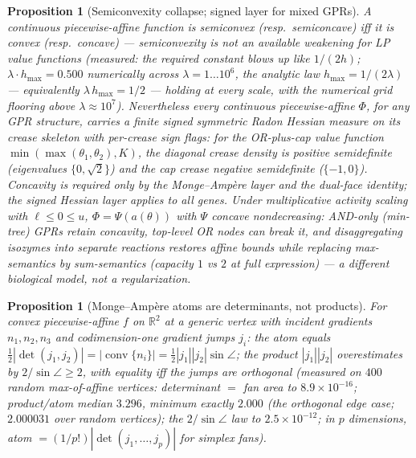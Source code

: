 \documentclass[11pt,a4paper]{article}
\theoremstyle{plain}
\newtheorem{proposition}[theorem]{Proposition}
\theoremstyle{definition}
\theoremstyle{remark}
\newcommand{\RR}{\mathbb{R}}
\begin{document}
\begin{proposition}[Semiconvexity collapse; signed layer for mixed
GPRs]\label{prop:semiconvex}
A continuous piecewise-affine function is semiconvex (resp.\
semiconcave) iff it is convex (resp.\ concave) --- semiconvexity is
not an available weakening for LP value functions (measured: the
required constant blows up like $1/(2h)$; $\lambda \cdot h_{\max}
= 0.500$ numerically across $\lambda = 1 \dots 10^{6}$, the analytic
law $h_{\max} = 1/(2\lambda)$ --- equivalently $\lambda\,
h_{\max} = 1/2$ --- holding at every scale,
with the numerical grid flooring above $\lambda \approx 10^{7}$).
Nevertheless
every continuous piecewise-affine $\Phi$, for any GPR structure,
carries a finite \emph{signed} symmetric Radon Hessian measure on
its crease skeleton with per-crease sign flags: for the OR-plus-cap
value function $\min(\max(\theta_1,\theta_2), K)$, the diagonal
crease density is positive semidefinite (eigenvalues
$\{0,\sqrt2\}$) and the cap crease negative semidefinite
($\{-1,0\}$). Concavity is required only by the
Monge--Amp\`ere layer and the dual-face identity; the signed Hessian
layer applies to all genes. Under multiplicative activity scaling
with $\ell \le 0 \le u$, $\Phi = \Psi(a(\theta))$ with $\Psi$
concave nondecreasing: AND-only (min-tree) GPRs retain concavity,
top-level OR nodes can break it, and disaggregating isozymes into
separate reactions restores affine bounds while replacing
max-semantics by sum-semantics (capacity $1$ vs $2$ at full
expression) --- a different biological model, not a regularization.
\end{proposition}

\begin{proposition}[Monge--Amp\`ere atoms are determinants, not
products]\label{prop:maatom}
For convex piecewise-affine $f$ on $\RR^2$ at a generic vertex with
incident gradients $n_1, n_2, n_3$ and codimension-one gradient jumps
$j_i$: the atom equals
$\tfrac12|\det(j_1, j_2)| =
|\operatorname{conv}\{n_i\}| =
\tfrac12 |j_1| |j_2| \sin\angle$; the product $|j_1||j_2|$
overestimates by $2/\sin\angle \ge 2$, with equality iff the jumps
are orthogonal (measured on $400$ random max-of-affine vertices:
determinant $=$ fan area to $8.9 \times 10^{-16}$; product/atom
median $3.296$, minimum exactly $2.000$ (the orthogonal edge case;
$2.000031$ over random vertices); the $2/\sin\angle$ law to
$2.5 \times 10^{-12}$; in $p$ dimensions, atom $=
(1/p!)|\det(j_1,\dots,j_p)|$ for simplex fans).
\end{proposition}
\end{document}
